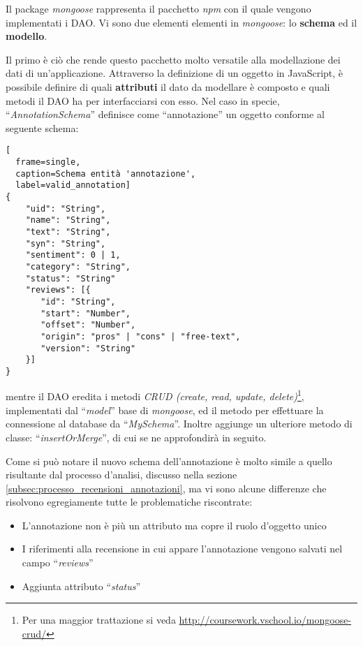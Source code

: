 Il package \textit{mongoose} rappresenta il pacchetto \textit{npm} con il quale
vengono implementati i \gls{DAO}. Vi sono due elementi elementi in
\textit{mongoose}: lo \textbf{schema} ed il \textbf{modello}.

Il primo è ciò che rende questo pacchetto molto versatile alla modellazione dei
dati di un'applicazione. Attraverso la definizione di un oggetto in JavaScript, 
è possibile definire di quali \textbf{attributi} il dato da modellare è composto
e quali metodi il \gls{DAO} ha per interfacciarsi con esso. Nel caso in specie,
``\textit{AnnotationSchema}'' definisce come ``annotazione'' un oggetto conforme
al seguente schema:
\begin{center}
\begin{lstlisting}[
  frame=single,
  caption=Schema entità 'annotazione',
  label=valid_annotation]
{
    "uid": "String",
    "name": "String",
    "text": "String",
    "syn": "String",
    "sentiment": 0 | 1,
    "category": "String",
    "status": "String"
    "reviews": [{
       "id": "String",
       "start": "Number",
       "offset": "Number",
       "origin": "pros" | "cons" | "free-text",
       "version": "String"
    }]
}
\end{lstlisting}
\end{center}

mentre il \gls{DAO} eredita i metodi \textit{CRUD (create, read, update,
delete)}\footnote{Per una maggior trattazione si veda
\url{http://coursework.vschool.io/mongoose-crud/}}, implementati dal
``\textit{model}'' base di \textit{mongoose}, ed il metodo per effettuare la
connessione al database da ``\textit{MySchema}''. Inoltre aggiunge un
ulteriore metodo di classe: ``\textit{insertOrMerge}'', di cui se ne 
approfondirà in seguito.

Come si può notare il nuovo schema dell'annotazione è molto simile a quello
risultante dal processo d'analisi, discusso nella sezione
\ref{subsec:processo_recensioni_annotazioni}, ma vi sono alcune differenze che
risolvono egregiamente tutte le problematiche riscontrate:
\begin{itemize}
\item L'annotazione non è più un attributo ma copre il ruolo d'oggetto unico
\item I riferimenti alla recensione in cui appare l'annotazione vengono salvati
nel campo ``\textit{reviews}''
\item Aggiunta attributo ``\textit{status}''
\end{itemize}

